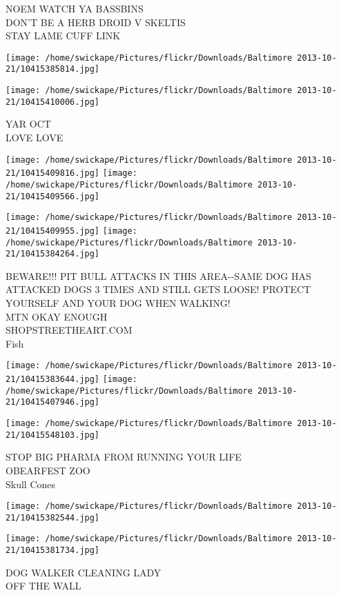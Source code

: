 \documentclass[10pt,letterpaper]{article}
\begin{document}
NOEM WATCH YA BASSBINS\\
DON'T BE A HERB DROID V SKELTIS\\
STAY LAME CUFF LINK
\pagebreak

\texttt{[image: /home/swickape/Pictures/flickr/Downloads/Baltimore 2013-10-21/10415385814.jpg]}

\vspace{0.25in}
\texttt{[image: /home/swickape/Pictures/flickr/Downloads/Baltimore 2013-10-21/10415410006.jpg]}

YAR OCT\\
LOVE LOVE
\pagebreak

\texttt{[image: /home/swickape/Pictures/flickr/Downloads/Baltimore 2013-10-21/10415409816.jpg]}
\texttt{[image: /home/swickape/Pictures/flickr/Downloads/Baltimore 2013-10-21/10415409566.jpg]}

\texttt{[image: /home/swickape/Pictures/flickr/Downloads/Baltimore 2013-10-21/10415409955.jpg]}
\texttt{[image: /home/swickape/Pictures/flickr/Downloads/Baltimore 2013-10-21/10415384264.jpg]}

BEWARE!!! PIT BULL ATTACKS IN THIS AREA{-}{-}SAME DOG HAS ATTACKED DOGS 3 TIMES AND STILL GETS LOOSE! PROTECT YOURSELF AND YOUR DOG WHEN WALKING!\\
MTN OKAY ENOUGH\\
SHOPSTREETHEART.COM\\
Fish
\pagebreak

\texttt{[image: /home/swickape/Pictures/flickr/Downloads/Baltimore 2013-10-21/10415383644.jpg]}
\texttt{[image: /home/swickape/Pictures/flickr/Downloads/Baltimore 2013-10-21/10415407946.jpg]}

\texttt{[image: /home/swickape/Pictures/flickr/Downloads/Baltimore 2013-10-21/10415548103.jpg]}

STOP BIG PHARMA FROM RUNNING YOUR LIFE\\
OBEARFEST ZOO\\
Skull Cones
\pagebreak

\texttt{[image: /home/swickape/Pictures/flickr/Downloads/Baltimore 2013-10-21/10415382544.jpg]}

\vspace{0.25in}
\texttt{[image: /home/swickape/Pictures/flickr/Downloads/Baltimore 2013-10-21/10415381734.jpg]}

DOG WALKER CLEANING LADY\\
OFF THE WALL
\pagebreak
\end{document}
